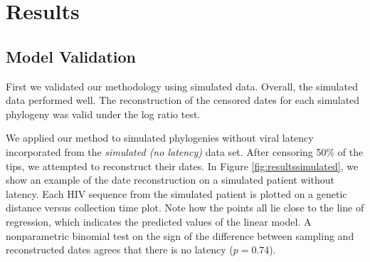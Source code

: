 \documentclass[12pt]{article}
\begin{document}



\section * {Results} \label{sec:results}


\subsection * {Model Validation} \label{sec:sim_results}
First we validated our methodology using simulated data.
Overall, the simulated data performed well. The reconstruction of the censored dates for each simulated phylogeny was valid under the log ratio test.

We applied our method to simulated phylogenies without viral latency incorporated from the \emph{simulated (no latency)} data set.
After censoring 50\% of the tips, we attempted to reconstruct their dates.
In Figure \ref{fig:resultssimulated}, we show an example of the date reconstruction on a simulated patient without latency.
Each HIV sequence from the simulated patient is plotted on a genetic distance versus collection time plot.
Note how the points all lie close to the line of regression, which indicates the predicted values of the linear model.
A nonparametric binomial test on the sign of the difference between sampling and reconstructed dates agrees that there is no latency ($p = 0.74$).
\end{document}
